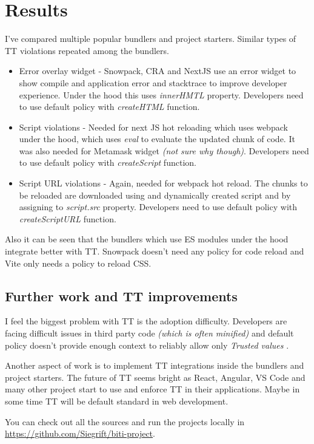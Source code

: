 \chapter{Results}

\label{chapter:results} %

I've compared multiple popular bundlers and project starters. Similar types of TT violations
repeated among the bundlers.

\begin{itemize}
  \item  Error overlay widget - Snowpack, CRA and NextJS use an error widget to show compile and
        application error and stacktrace to improve developer experience. Under the hood this uses
        \emph{innerHMTL} property. Developers need to use default policy with \emph{createHTML}
        function.
  \item  Script violations - Needed for next JS hot reloading which uses webpack under the hood,
        which uses \emph{eval} to evaluate the updated chunk of code. It was also needed for
        Metamask widget \emph{(not sure why though)}. Developers need to use default policy with
        \emph{createScript} function.
  \item  Script URL violations - Again, needed for webpack hot reload. The chunks to be reloaded are
        downloaded using and dynamically created script and by assigning to \emph{script.src}
        property. Developers need to use default policy with \emph{createScriptURL} function.
\end{itemize}

Also it can be seen that the bundlers which use ES modules under the hood integrate better with TT.
Snowpack doesn't need any policy for code reload and Vite only needs a policy to reload CSS.

\section{Further work and TT improvements}

I feel the biggest problem with TT is the adoption difficulty. Developers are facing difficult
issues in third party code \emph{(which is often minified)} and default policy doesn't provide
enough context to reliably allow only \emph{Trusted values}
\cite{tt_source_file_violation_issue_comment}.

Another aspect of work is to implement TT integrations inside the bundlers and project starters. The
future of TT seems bright as React, Angular, VS Code and many other project start to use and enforce
TT in their applications. Maybe in some time TT will be default standard in web development.

You can check out all the sources and run the projects locally in
\url{https://github.com/Siegrift/biti-project}.
